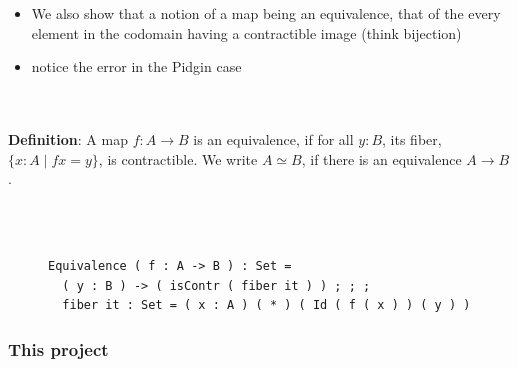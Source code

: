 \documentclass[10pt]{beamer}
\newcommand{\equalH}[2]{#1 = #2}
\newcommand{\comprehensionH}[3]{\{ #1 : #2 \mid #3 \}}
\newcommand{\arrowH}[2]{#1 \rightarrow #2}
\newcommand{\appH}[2]{#1 #2}
\newcommand{\equivalenceH}[2]{#1 \simeq #2}
\begin{document}
\begin{frame}[fragile]

\begin{itemize}
\item We also show that a notion of a map being an equivalence, that of the
  every element in the codomain having a contractible image (think bijection) 
\item notice the error in the Pidgin case
\end{itemize}

\\~\\

 \textbf{Definition}:
 A map $f : \arrowH {A}{B}$ is an equivalence, if for all $y : B$, its fiber, $\comprehensionH {x}{A}{\equalH {\appH {f}{x}}{y}}$, is contractible.
 We write $\equivalenceH {A}{B}$, if there is an equivalence $\arrowH {A}{B}$.

\\~\\

\begin{figure}
\begin{verbatim}
Equivalence ( f : A -> B ) : Set = 
  ( y : B ) -> ( isContr ( fiber it ) ) ; ; ; 
  fiber it : Set = ( x : A ) ( * ) ( Id ( f ( x ) ) ( y ) )
\end{verbatim}
\end{figure}



\end{frame}

\begin{frame}

\frametitle{This project}

\end{frame}
\end{document}
